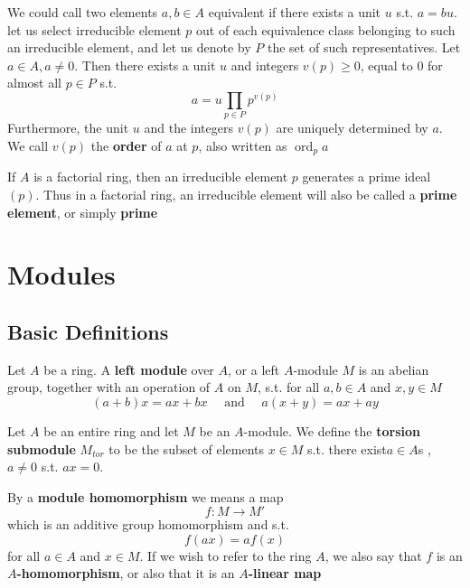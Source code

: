 \documentclass[11pt]{article}
\def \ord {\operatorname{ord}}
\begin{document}
We could call two elements \(a,b\in A\) equivalent if there exists a unit \(u\) s.t. \(a=bu\). let
us select irreducible element \(p\) out of each equivalence class belonging to such an
irreducible element, and let us denote by \(P\) the set of such representatives.
Let \(a\in A,a\neq 0\). Then there exists a unit \(u\) and integers \(v(p)\ge 0\), equal to 0 for almost
all \(p\in P\) s.t.
\begin{equation*}
a=u\prod_{p\in P}p^{v(p)}
\end{equation*}
Furthermore, the unit \(u\) and the integers \(v(p)\) are uniquely determined by \(a\). We
call \(v(p)\) the \textbf{order} of \(a\) at \(p\), also written as \(\ord_pa\)

If \(A\) is a factorial ring, then an irreducible element \(p\) generates a prime ideal \((p)\).
Thus in a factorial ring, an irreducible element will also be called a \textbf{prime element}, or simply \textbf{prime}


\section{Modules}
\label{sec:org966088c}

\subsection{Basic Definitions}
\label{sec:orgff211ae}
Let \(A\) be a ring. A \textbf{left module} over \(A\), or a left \(A\)-module \(M\) is an abelian group,
together with an operation of \(A\) on \(M\), s.t. for all \(a,b\in A\) and \(x,y\in M\)
\begin{equation*}
(a+b)x=ax+bx \quad\text{ and }\quad a(x+y)=ax+ay
\end{equation*}

Let \(A\) be an entire ring and let \(M\) be an \(A\)-module. We define the \textbf{torsion
submodule} \(M_{tor}\) to be the subset of elements \(x\in M\) s.t. there exist\(a\in A\)s , \(a\neq 0\)
s.t. \(ax=0\).

By a \textbf{module homomorphism} we means a map
\begin{equation*}
f:M\to M'
\end{equation*}
which is an additive group homomorphism and s.t.
\begin{equation*}
f(ax)=af(x)
\end{equation*}
for all \(a\in A\) and \(x\in M\). If we wish to refer to the ring \(A\), we also say that \(f\) is
an \textbf{\(A\)-homomorphism}, or also that it is an \textbf{\(A\)-linear map}
\end{document}
